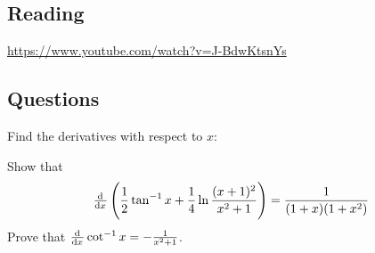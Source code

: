 


\subsection*{Reading}
\begin{center}
\begin{tcolorbox}[width=0.8\textwidth,colback={red},title={\textbf{Go and watch...}},colbacktitle=yellow,coltitle=blue]
  \textcolor{white}{\url{https://www.youtube.com/watch?v=J-BdwKtsnYs}}
\end{tcolorbox}
\end{center}

\subsection*{Questions}
\begin{questions}
  \question Find the derivatives with respect to $ x $:
  \question Show that
    \begin{displaymath}
      \od{}{x} \left( \frac{1}{2} \tan^{-1} x + \frac{1}{4} \ln\frac{(x + 1)^2}{x^2 + 1} \right) = \frac{1}{(1 + x)(1 + x^2)}
    \end{displaymath}
  \question Prove that $ \od{}{x} \cot^{-1} x = -\frac{1}{x^2 + 1} $.
\end{questions}


